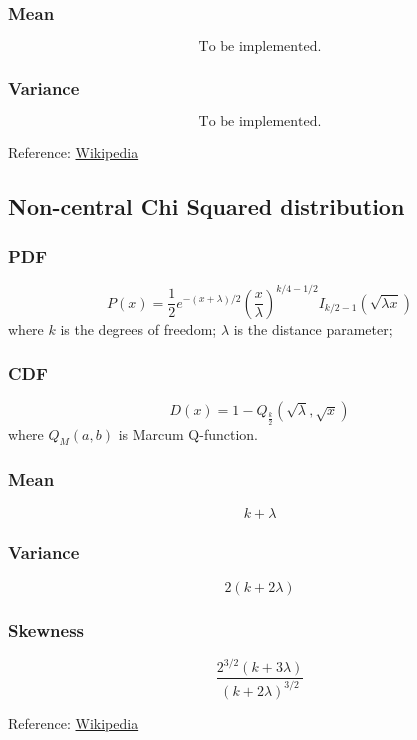 \subsubsection*{Mean}
\[
    \text{To be implemented.}
\]

\subsubsection*{Variance}
\[
    \text{To be implemented.}
\]

Reference:
\href{https://en.wikipedia.org/wiki/Noncentral_chi_distribution}{Wikipedia}

\subsection{Non-central Chi Squared distribution}

\subsubsection*{PDF}
\[
    P(x) = {\frac {1}{2}}e^{-(x+\lambda )/2}\left({\frac {x}{\lambda }}\right)
    ^{k/4-1/2}I_{k/2-1}({\sqrt {\lambda x}})
\]
where $k$ is the degrees of freedom; $\lambda$ is the distance parameter;

\subsubsection*{CDF}
\[
    D(x) = 1-Q_{\frac {k}{2}}\left({\sqrt {\lambda }},{\sqrt {x}}\right)
\]
where $Q_M(a,b)$ is Marcum Q-function.

\subsubsection*{Mean}
\[
    k + \lambda
\]

\subsubsection*{Variance}
\[
    2(k+2\lambda)
\]

\subsubsection*{Skewness}
\[
    \frac{2^{3/2}(k+3\lambda)}{(k+2\lambda)^{3/2}}
\]

Reference:
\href{https://en.wikipedia.org/wiki/Noncentral_chi-squared_distribution}{Wikipedia}

